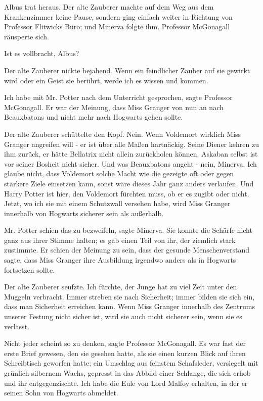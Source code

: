 Albus trat heraus. Der alte Zauberer machte auf dem Weg aus dem Krankenzimmer
keine Pause, sondern ging einfach weiter in Richtung von Professor Flitwicks
Büro; und Minerva folgte ihm. Professor McGonagall räusperte sich.

\glqq Ist es vollbracht, Albus?\grqq{}

Der alte Zauberer nickte bejahend. \glqq Wenn ein feindlicher Zauber auf sie
gewirkt wird oder ein Geist sie berührt, werde ich es wissen und kommen.\grqq{}

\glqq Ich habe mit Mr. Potter nach dem Unterricht gesprochen\grqq{}, sagte
Professor McGonagall. \glqq Er war der Meinung, dass Miss Granger von nun an
nach Beauxbatons und nicht mehr nach Hogwarts gehen sollte.\grqq{}

Der alte Zauberer schüttelte den Kopf. \glqq Nein. Wenn Voldemort wirklich Miss
Granger angreifen will - er ist über alle Maßen hartnäckig. Seine Diener kehren
zu ihm zurück, er hätte Bellatrix nicht allein zurückholen können. Askaban
selbst ist vor seiner Bosheit nicht sicher. Und was Beauxbatons angeht - nein,
Minerva. Ich glaube nicht, dass Voldemort solche Macht wie die gezeigte oft oder
gegen stärkere Ziele einsetzen kann, sonst wäre dieses Jahr ganz anders
verlaufen. Und Harry Potter ist hier, den Voldemort fürchten muss, ob er es
zugibt oder nicht. Jetzt, wo ich sie mit einem Schutzwall versehen habe, wird
Miss Granger innerhalb von Hogwarts sicherer sein als außerhalb.\grqq{}

\glqq Mr. Potter schien das zu bezweifeln\grqq{}, sagte Minerva. Sie konnte die
Schärfe nicht ganz aus ihrer Stimme halten; es gab einen Teil von ihr, der
ziemlich stark zustimmte. \glqq Er schien der Meinung zu sein, dass der gesunde
Menschenverstand sagte, dass Miss Granger ihre Ausbildung irgendwo anders als in
Hogwarts fortsetzen sollte.\grqq{}

Der alte Zauberer seufzte. \glqq Ich fürchte, der Junge hat zu viel Zeit unter
den Muggeln verbracht. Immer streben sie nach Sicherheit; immer bilden sie sich
ein, dass man Sicherheit erreichen kann. Wenn Miss Granger innerhalb des
Zentrums unserer Festung nicht sicher ist, wird sie auch nicht sicherer sein,
wenn sie es verlässt.\grqq{}

\glqq Nicht jeder scheint so zu denken\grqq{}, sagte Professor McGonagall. Es
war fast der erste Brief gewesen, den sie gesehen hatte, als sie einen kurzen
Blick auf ihren Schreibtisch geworfen hatte; ein Umschlag aus feinstem
Schafsleder, versiegelt mit grünlich-silbernem Wachs, gepresst in das Abbild
einer Schlange, die sich erhob und ihr entgegenzischte. \glqq Ich habe die Eule
von Lord Malfoy erhalten, in der er seinen Sohn von Hogwarts abmeldet.\grqq{}

